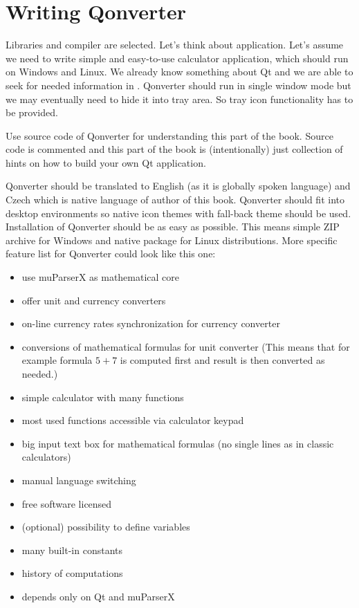 \chapter{Writing Qonverter}
Libraries and compiler are selected. Let's think about application. Let's assume we need to write simple and easy-to-use calculator application, which should run on Windows and Linux. We already know something about Qt and we are able to seek for needed information in \citep{various:qtdoc}. Qonverter should run in single window mode but we may eventually need to hide it into tray area. So tray icon functionality has to be provided.

\begin{fdocextra}
Use source code of Qonverter for understanding this part of the book. Source code is commented and this part of the book is (intentionally) just collection of hints on how to build your own Qt application.
\end{fdocextra}

Qonverter should be translated to English (as it is globally spoken language) and Czech which is native language of author of this book. Qonverter should fit into desktop environments so native icon themes with fall-back theme should be used. Installation of Qonverter should be as easy as possible. This means simple ZIP archive for Windows and native package for Linux distributions. More specific feature list for Qonverter could look like this one:
\begin{itemize}
\item use muParserX as mathematical core
\item offer unit and currency converters
\item on-line currency rates synchronization for currency converter
\item conversions of mathematical formulas for unit converter (This means that for example formula $5+7$ is computed first and result is then converted as needed.)
\item simple calculator with many functions
\item most used functions accessible via calculator keypad
\item big input text box for mathematical formulas (no single lines as in classic calculators)
\item manual language switching
\item free software licensed
\item (optional) possibility to define variables
\item many built-in constants
\item history of computations
\item depends only on Qt and muParserX
\end{itemize}

